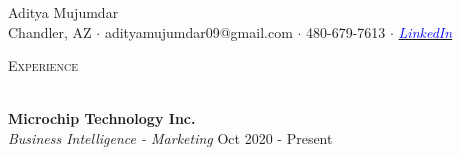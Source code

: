 \documentclass[letterpaper]{article}
\newcommand{\lineunder} {
    \vspace*{-8pt} \\
    \hspace*{-18pt} \hrulefill \\
}
\newcommand{\header}[1] {
    {\hspace*{-18pt}\vspace*{6pt} \textsc{#1}}
    \vspace*{-6pt} \lineunder
}
\begin{document}
\vspace*{-40pt}

\vspace*{-10pt}
\begin{center}
    {\Huge  {Aditya Mujumdar}}\\
    \vspace{1mm}
    {\normalsize {Chandler, AZ $\cdot$ adityamujumdar09@gmail.com $\cdot$ 480-679-7613 $\cdot$ \href{https://www.linkedin.com/in/aditya-mujumdar/}{\textcolor{blue}{\textit{LinkedIn}}}}}\\
\end{center}

\header{\large{Experience}}
\vspace{1mm}

\textbf{Microchip Technology Inc.}\\
\textit{Business Intelligence - Marketing} \hfill Oct 2020 - Present\\
\vspace{-1mm}
\end{document}
